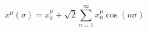 \begin{equation}\label{eq40:ps}
	x^{\mu}(\sigma)=x^{\mu}_{0}+\sqrt{2}\sum^{\infty}_{n=1}x^{\mu}_{n}\cos(n\sigma)
\end{equation}

